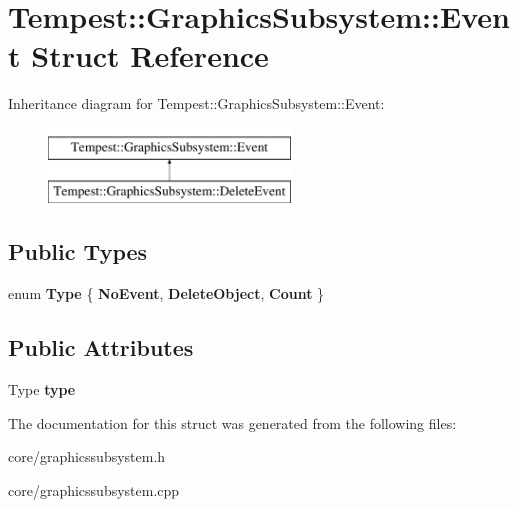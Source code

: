 \hypertarget{struct_tempest_1_1_graphics_subsystem_1_1_event}{\section{Tempest\+:\+:Graphics\+Subsystem\+:\+:Event Struct Reference}
\label{struct_tempest_1_1_graphics_subsystem_1_1_event}
}
Inheritance diagram for Tempest\+:\+:Graphics\+Subsystem\+:\+:Event\+:\begin{figure}[H]
\begin{center}
\leavevmode
\includegraphics[height=2.000000cm]{struct_tempest_1_1_graphics_subsystem_1_1_event}
\end{center}
\end{figure}
\subsection*{Public Types}
\begin{DoxyCompactItemize}
\item 
\hypertarget{struct_tempest_1_1_graphics_subsystem_1_1_event_aee9c81a4df7bf24670fbec79fc13054d}{enum {\bfseries Type} \{ {\bfseries No\+Event}, 
{\bfseries Delete\+Object}, 
{\bfseries Count}
 \}}\label{struct_tempest_1_1_graphics_subsystem_1_1_event_aee9c81a4df7bf24670fbec79fc13054d}

\end{DoxyCompactItemize}
\subsection*{Public Attributes}
\begin{DoxyCompactItemize}
\item 
\hypertarget{struct_tempest_1_1_graphics_subsystem_1_1_event_a6f95f8855a6d2008b6988aa941ecee20}{Type {\bfseries type}}\label{struct_tempest_1_1_graphics_subsystem_1_1_event_a6f95f8855a6d2008b6988aa941ecee20}

\end{DoxyCompactItemize}


The documentation for this struct was generated from the following files\+:\begin{DoxyCompactItemize}
\item 
core/graphicssubsystem.\+h\item 
core/graphicssubsystem.\+cpp\end{DoxyCompactItemize}
